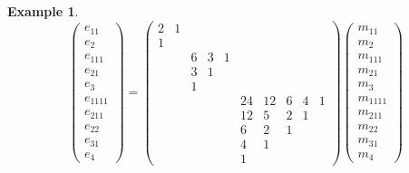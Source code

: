 \documentclass[12pt]{article}
\theoremstyle{plain}
\theoremstyle{definition}
\newtheorem{example}[theorem]{Example}
\theoremstyle{remark}
\numberwithin{equation}{section}
\begin{document}
\begin{example}
\[
\begin{pmatrix} e_{11}\\ e_2\\ e_{111}\\ e_{21}\\ e_3\\
e_{1111}\\ e_{211} \\ e_{22}\\ e_{31}\\ e_4
\end{pmatrix}
=
\begin{pmatrix}
2 & 1 &
 & & &
& & & & \\
1 & &
 & & &
& & & & \\
 & &
6 & 3 & 1 &
& & & & \\
 & &
3 & 1 & &
& & & & \\
 & &
1 & & &
& & & & \\
 & &
 & & &
24 & 12 & 6 & 4 & 1 \\
 & &
 & & &
12 & 5 & 2 & 1 & \\
 & &
 & & &
6 & 2 & 1 & & \\
 & &
 & & &
4 & 1 & & & \\
 & &
 & & &
1 & & & &
\end{pmatrix} 
\begin{pmatrix} m_{11}\\ m_2\\ m_{111}\\ m_{21}\\ m_3\\
m_{1111}\\ m_{211} \\ m_{22}\\ m_{31}\\ m_4
\end{pmatrix}
\]
\end{example}
\end{document}
